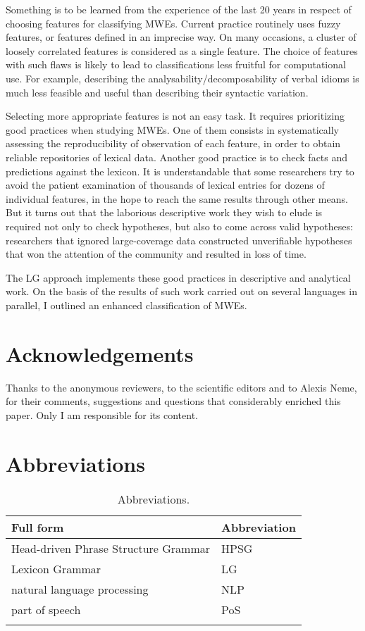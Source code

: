 \documentclass[output=paper]{langsci/langscibook}
\begin{document}
Something is to be learned from the experience of the last 20 years in respect of choosing features for classifying MWEs. Current practice routinely uses fuzzy features, or features defined in an imprecise way. On many occasions, a cluster of loosely correlated features is considered as a single feature. The choice of features with such flaws is likely to lead to classifications less fruitful for computational use. For example, describing the analysability\slash decomposability of verbal idioms is much less feasible and useful than describing their syntactic variation.

Selecting more appropriate features is not an easy task. It requires prioritizing good practices when studying MWEs. One of them consists in systematically assessing the reproducibility of observation of each feature, in order to obtain reliable repositories of lexical data. Another good practice is to check facts and predictions against the lexicon. It is understandable that some researchers try to avoid the patient examination of thousands of lexical entries for dozens of individual features, in the hope to reach the same results through other means. But it turns out that the laborious descriptive work they wish to elude is required not only to check hypotheses, but also to come across valid hypotheses: researchers that ignored large-coverage data constructed unverifiable hypotheses that won the attention of the community and resulted in loss of time.

The LG approach implements these good practices in descriptive and analytical work. On the basis of the results of such work carried out on several languages in parallel, I outlined an enhanced classification of MWEs.

\section*{Acknowledgements}

Thanks to the anonymous reviewers, to the scientific editors and to Alexis Neme, for their comments, suggestions and questions that considerably enriched this paper. Only I am responsible for its content.

\section*{Abbreviations}

\begin{table}[H]
\begin{tabular}{ll}
\lsptoprule
Full form  & Abbreviation \\
\midrule
Head-driven Phrase Structure Grammar & HPSG\\
Lexicon Grammar & LG \\
natural language processing & NLP\\
part of speech & PoS \\
\lspbottomrule
\end{tabular}
\caption{Abbreviations.}
\end{table}


\printbibliography[heading=subbibliography,notkeyword=this]
\end{document}
